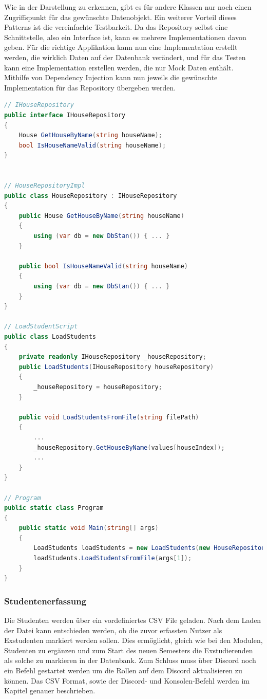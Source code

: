 \documentclass[a4paper, table]{article}
\begin{document}
Wie in der Darstellung zu erkennen, gibt es für andere Klassen nur noch einen Zugriffspunkt für das gewünschte Datenobjekt.
\newline
Ein weiterer Vorteil dieses Patterns ist die vereinfachte Testbarkeit.
Da das Repository selbst eine Schnittstelle, also ein Interface ist, kann es mehrere Implementationen davon geben.
Für die richtige Applikation kann nun eine Implementation erstellt werden, die wirklich Daten auf der Datenbank verändert,
und für das Testen kann eine Implementation erstellen werden, die nur Mock Daten enthält.\\
Mithilfe von Dependency Injection kann nun jeweils die gewünschte Implementation für das Repository übergeben werden.

\begin{lstlisting}[language=csharp]
// IHouseRepository
public interface IHouseRepository
{
    House GetHouseByName(string houseName);
    bool IsHouseNameValid(string houseName);
}


// HouseRepositoryImpl
public class HouseRepository : IHouseRepository
{
    public House GetHouseByName(string houseName)
    {
        using (var db = new DbStan()) { ... }
    }

    public bool IsHouseNameValid(string houseName)
    {
        using (var db = new DbStan()) { ... }
    }
}

// LoadStudentScript
public class LoadStudents
{
    private readonly IHouseRepository _houseRepository;
    public LoadStudents(IHouseRepository houseRepository)
    {
        _houseRepository = houseRepository;
    }

    public void LoadStudentsFromFile(string filePath)
    {
        ...
        _houseRepository.GetHouseByName(values[houseIndex]);
        ...
    }
}

// Program
public static class Program
{
    public static void Main(string[] args)
    {
        LoadStudents loadStudents = new LoadStudents(new HouseRepository());
        loadStudents.LoadStudentsFromFile(args[1]);
    }
}
\end{lstlisting}

\subsubsection{Studentenerfassung}

Die Studenten werden über ein vordefiniertes CSV File geladen.
Nach dem Laden der Datei kann entschieden werden, ob die zuvor erfassten Nutzer als Exstudenten markiert werden sollen.
Dies ermöglicht, gleich wie bei den Modulen, Studenten zu ergänzen und zum Start des neuen Semesters die Exstudierenden als solche zu markieren in der Datenbank.
Zum Schluss muss über Discord noch ein Befehl gestartet werden um die Rollen auf dem Discord aktualisieren zu können.
Das CSV Format, sowie der Discord- und Konsolen-Befehl werden im Kapitel  genauer beschrieben.
\end{document}
